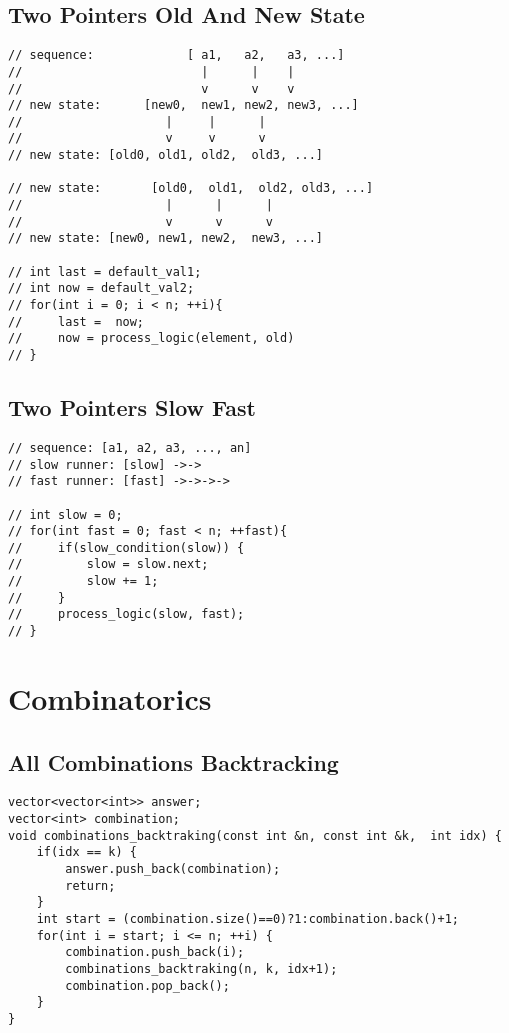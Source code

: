 \documentclass[10pt,letterpaper,twocolumn,twosided]{article}
\begin{document}
\subsection{Two Pointers Old And New State}
\begin{lstlisting}
// sequence:             [ a1,   a2,   a3, ...]
//                         |      |    |
//                         v      v    v
// new state:      [new0,  new1, new2, new3, ...]
//                    |     |      |
//                    v     v      v
// new state: [old0, old1, old2,  old3, ...]

// new state:       [old0,  old1,  old2, old3, ...]
//                    |      |      |
//                    v      v      v
// new state: [new0, new1, new2,  new3, ...]

// int last = default_val1;
// int now = default_val2;
// for(int i = 0; i < n; ++i){
//     last =  now;
//     now = process_logic(element, old)
// }
\end{lstlisting}

\subsection{Two Pointers Slow Fast}
\begin{lstlisting}
// sequence: [a1, a2, a3, ..., an]
// slow runner: [slow] ->->
// fast runner: [fast] ->->->->

// int slow = 0;
// for(int fast = 0; fast < n; ++fast){
//     if(slow_condition(slow)) {
//         slow = slow.next;
//         slow += 1;
//     }
//     process_logic(slow, fast);
// }
\end{lstlisting}


\section{Combinatorics}

\subsection{All Combinations Backtracking}
\begin{lstlisting}
vector<vector<int>> answer;
vector<int> combination;
void combinations_backtraking(const int &n, const int &k,  int idx) {
    if(idx == k) {
        answer.push_back(combination);
        return;
    }
    int start = (combination.size()==0)?1:combination.back()+1;
    for(int i = start; i <= n; ++i) {
        combination.push_back(i);
        combinations_backtraking(n, k, idx+1);    
        combination.pop_back();
    }
}
\end{lstlisting}
\end{document}
